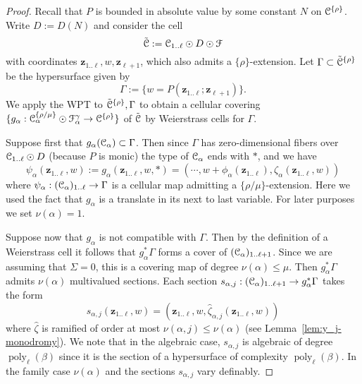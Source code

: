 \documentclass[reqno]{amsart}
\renewcommand\~[1]{\widetilde{#1}}
\def\poly{\operatorname{poly}} \def\J{\operatorname{J}}
\def\cF{{\mathcal F}} \def\cL{{\mathcal L}} \def\cR{{\mathcal R}}
\def\vz{{\mathbf z}}
\def\he#1{{\{#1\}}}
\def\hrho{{\he\rho}}
\begin{document}
\begin{proof}
  Recall that $P$ is bounded in absolute value by some constant $N$ on
  $\cC^\hrho$. Write $D:=D(N)$ and consider the cell
  \begin{equation}
    \tilde\cC:=\cC_{1..\ell}\odot D\odot\cF
  \end{equation}
  with coordinates $\vz_{1..\ell},w,\vz_{\ell+1}$, which also admits a
  $\hrho$-extension. Let $\Gamma\subset\tilde\cC^\hrho$ be the hypersurface
  given by
  \begin{equation}
    \Gamma := \{ w=P(\vz_{1..\ell};\vz_{\ell+1}) \}.
  \end{equation}
  We apply the WPT to $\tilde\cC^\hrho,\Gamma$ to obtain a cellular
  covering
  $\{g_\alpha:\cC_\alpha^{\he{\rho/\mu}}\odot\cF_\alpha^\gamma\to\cC^\hrho\}$
  of $\tilde{{\mathcal C}}$ by Weierstrass cells for $\Gamma$.

  Suppose first that $g_\alpha({\mathcal C}_\alpha)\subset\Gamma$. Then
  since $\Gamma$ has zero-dimensional fibers over
  ${\mathcal C}_{1..\ell}\odot D$ (because $P$ is monic) the type of ${\mathcal C}_\alpha$
  ends with $*$, and we have
  \begin{equation}\label{eq:psi-subord}
    \psi_\alpha(\vz_{1..\ell},w) := g_\alpha(\vz_{1..\ell},w,*) = (\cdots, w+\phi_\alpha(\vz_{1..\ell}),\zeta_\alpha(\vz_{1..\ell},w))
  \end{equation}
  where $\psi_\alpha:({\mathcal C}_\alpha)_{1..\ell}\to\Gamma$ is a cellular
  map admitting a $\he{\rho/\mu}$-extension. Here we used the fact that
  $g_\alpha$ is a translate in its next to last variable. For later
  purposes we set $\nu(\alpha)=1$.

  Suppose now that $g_\alpha$ is not compatible with $\Gamma$. Then by
  the definition of a Weierstrass cell it follows that
  $g_\alpha^*\Gamma$ forms a cover of
  $({\mathcal C}_\alpha)_{1..\ell+1}$. Since we are assuming that $\Sigma=0$,
  this is a covering map of degree $\nu(\alpha)\le\mu$. Then
  $g_\alpha^*\Gamma$ admits $\nu(\alpha)$ multivalued sections. Each
  section $s_{\alpha,j}:({\mathcal C}_\alpha)_{1..\ell+1}\to g_\alpha^*\Gamma$
  takes the form
  \begin{equation}
    s_{\alpha,j}(\vz_{1..\ell},w) = (\vz_{1..\ell},w,\hat\zeta_{\alpha,j}(\vz_{1..\ell},w))
  \end{equation}
  where $\hat\zeta$ is ramified of order at most
  $\nu(\alpha,j)\le\nu(\alpha)$ (see
  Lemma~\ref{lem:y_j-monodromy}). We note that in the algebraic case,
  $s_{\alpha,j}$ is algebraic of degree $\poly_\ell(\beta)$ since it
  is the section of a hypersurface of complexity
  $\poly_\ell(\beta)$. In the family case $\nu(\alpha)$ and the
  sections $s_{\alpha,j}$ vary definably.


\end{proof}
\end{document}
